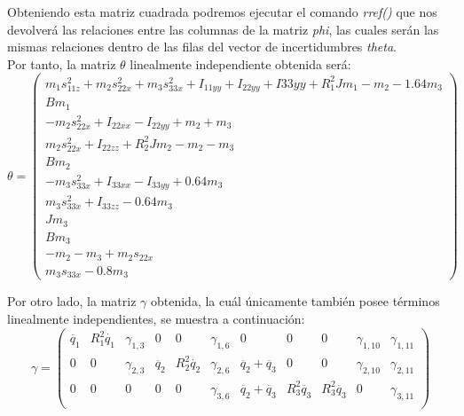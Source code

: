 		Obteniendo esta matriz cuadrada podremos ejecutar el comando \textit{rref()} que nos devolverá las relaciones entre las columnas de la matriz \textit{phi}, las cuales serán las mismas relaciones dentro de las filas del vector de incertidumbres \textit{theta}.\\

Por tanto, la matriz $\theta$ linealmente independiente obtenida será:
			\[
			\theta=
				\begin{pmatrix}
					  m_{1}s_{11z}^{2} + m_{2}s_{22x}^{2} + m_{3}s_{33x}^{2} + I_{11yy} + I_{22yy} + I{33yy} + R_{1}^{2}Jm_1 - m_2 - 1.64m_3 \\
					  Bm_{1}  \\
					  -m_{2}s_{22x}^{2} + I_{22xx} - I_{22yy} + m_{2} + m_{3} \\
					  m_{2}s_{22x}^{2} + I_{22zz} + R_{2}^{2}Jm_{2} - m_{2} - m_{3}  \\
					  Bm_{2} \\
					  - m_{3}s_{33x}^{2} + I_{33xx} - I_{33yy} + 0.64m_{3} \\
					  m_{3}s_{33x}^{2} + I_{33zz} - 0.64m_{3}  \\
					  Jm_{3}  \\
					  Bm_{3}  \\
					  -m_{2} -m_{3} + m_{2}s_{22x}  \\
					  m_{3}s_{33x} - 0.8m_{3}
				\end{pmatrix}
			\]

\vspace{1cm}
Por otro lado, la matriz $\gamma$ obtenida, la cuál únicamente también posee términos linealmente independientes, se muestra a continuación:
			\[
\gamma=
\begin{pmatrix}
\ddot{q_1} & R_{1}^{2}\dot{q_1} & \gamma_{1,3} & 0 & 0  & \gamma_{1,6} & 0 & 0 & 0 & \gamma_{1,10} & \gamma_{1,11} \\
0 & 0 & \gamma_{2,3} & \ddot{q_2} & R_{2}^{2}\dot{q_2} & \gamma_{2,6} & \ddot{q_2} + \ddot{q_3} & 0 & 0 & \gamma_{2,10} & \gamma_{2,11} \\
0 & 0 & 0 & 0 & 0 & \gamma_{3,6} & \ddot{q_2} + \ddot{q_3} & R_{3}^{2}\ddot{q_3} & R_{3}^{2}\ddot{q_3} & 0 & \gamma_{3,11} \\
\end{pmatrix} \] \vspace{0.3cm}

